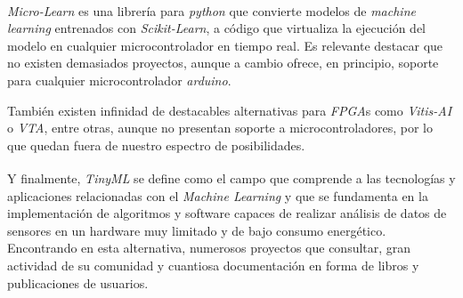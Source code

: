 \textit{Micro-Learn}\textsuperscript{\cite{microlearn}} es una librería para
\textit{python} que convierte modelos de \textit{machine learning} entrenados
con \textit{Scikit-Learn},
a código que virtualiza la ejecución del modelo en cualquier microcontrolador
en tiempo real.
Es relevante destacar que no existen demasiados proyectos, aunque a cambio
ofrece, en principio, soporte para cualquier microcontrolador \textit{arduino}.

También existen infinidad de destacables alternativas para \textit{FPGA}s como
\textit{Vitis-AI} o \textit{VTA}, entre otras, aunque no presentan soporte a
microcontroladores, por lo que quedan fuera de nuestro espectro de posibilidades.

Y finalmente, \textit{TinyML}\textsuperscript{\cite{tinyMl}} se define como el
campo que comprende a las tecnologías y aplicaciones relacionadas con el
\textit{Machine Learning} y que se fundamenta en la implementación de algoritmos
y software capaces de realizar análisis de datos de sensores en un hardware
muy limitado y de bajo consumo energético. Encontrando en esta alternativa,
numerosos proyectos que consultar, gran actividad de su comunidad y cuantiosa
documentación en forma de libros y publicaciones de usuarios.

